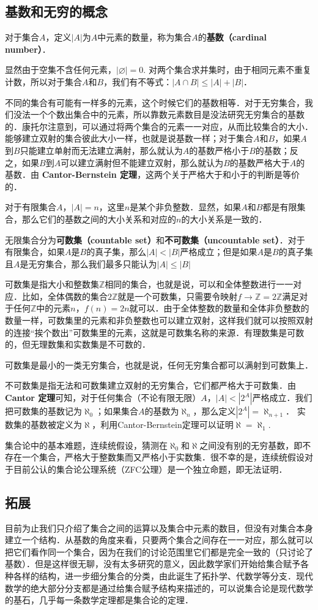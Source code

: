 \subsection{基数和无穷的概念}

对于集合$A$，定义$|A|$为$A$中元素的数量，称为集合$A$的\textbf{基数（cardinal number）}．

显然由于空集不含任何元素，$|\varnothing|=0$. 对两个集合求并集时，由于相同元素不重复计数，所以对于集合$A$和$B$，我们有不等式：$|A\cap B|\le|A|+|B|$．

不同的集合有可能有一样多的元素，这个时候它们的基数相等．对于无穷集合，我们没法一个个数出集合中的元素，所以靠数元素数目是没法研究无穷集合的基数的．康托尔注意到，可以通过将两个集合的元素一一对应，从而比较集合的大小．能够建立双射的集合彼此大小一样，也就是说基数一样；对于集合$A$和$B$，如果$A$到$B$只能建立单射而无法建立满射，那么就认为$A$的基数严格小于$B$的基数；反之，如果$B$到$A$可以建立满射但不能建立双射，那么就认为$B$的基数严格大于$A$的基数．由 \textbf{Cantor-Bernstein 定理}，这两个关于严格大于和小于的判断是等价的．

对于有限集合$A$，$|A|=n$，这里$n$是某个非负整数．显然，如果$A$和$B$都是有限集合，那么它们的基数之间的大小关系和对应的$n$的大小关系是一致的．

无限集合分为\textbf{可数集（countable set）}和\textbf{不可数集（uncountable set）}．对于有限集合，如果$A$是$B$的真子集，那么$|A|<|B|$严格成立；但是如果$A$是$B$的真子集且$A$是无穷集合，那么我们最多只能认为$|A|\le|B|$

可数集是指大小和整数集$\mathbb{Z}$相同的集合，也就是说，可以和全体整数进行一一对应．比如，全体偶数的集合$2\mathbb{Z}$就是一个可数集，只需要令映射$f\rightarrow \mathbb{Z}=2\mathbb{Z}$满足对于任何$\mathbb{Z}$中的元素$n$，$f(n)=2n$就可以．由于全体整数的数量和全体非负整数的数量一样，可数集里的元素和非负整数也可以建立双射，这样我们就可以按照双射的连接“挨个数出”可数集里的元素，这就是可数集名称的来源．有理数集是可数的，但无理数集和实数集是不可数的．

可数集是最小的一类无穷集合，也就是说，任何无穷集合都可以满射到可数集上．

不可数集是指无法和可数集建立双射的无穷集合，它们都严格大于可数集．由 \textbf{Cantor 定理}可知，对于任何集合（不论有限无限）$A$，$|A|<|2^A|$严格成立．我们把可数集的基数记为$\aleph_0$；如果集合$A$的基数为$\aleph_n$，那么定义$|2^A|=\aleph_{n+1}$． 实数集的基数被定义为$\aleph$，利用Cantor-Bernstein定理可以证明$\aleph=\aleph_1$. 

集合论中的基本难题，连续统假设，猜测在$\aleph_0$和$\aleph$之间没有别的无穷基数，即不存在一个集合，严格大于整数集而又严格小于实数集．很不幸的是，连续统假设对于目前公认的集合论公理系统（ZFC公理）是一个独立命题，即无法证明．
\phi
\subsection{拓展}
目前为止我们只介绍了集合之间的运算以及集合中元素的数目，但没有对集合本身建立一个结构．从基数的角度来看，只要两个集合之间存在一一对应，那么就可以把它们看作同一个集合，因为在我们的讨论范围里它们都是完全一致的（只讨论了基数）．但是这样很无聊，没有太多研究的意义，因此数学家们开始给集合赋予各种各样的结构，进一步细分集合的分类，由此诞生了拓扑学、代数学等分支．现代数学的绝大部分分支都是通过给集合赋予结构来描述的，可以说集合论是现代数学的基石，几乎每一条数学定理都是集合论的定理．
